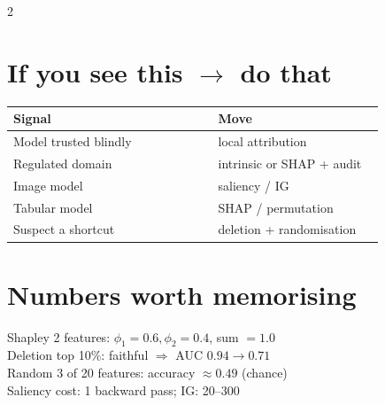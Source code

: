 \documentclass[11pt,a4paper]{article}
\newcommand{\sect}[1]{\section*{#1}}
\begin{document}
\begin{multicols}{2}
\sect{If you see this $\rightarrow$ do that}
\begin{tabular}{@{}p{0.52\linewidth}p{0.42\linewidth}@{}}
\toprule
Signal & Move\\
\midrule
Model trusted blindly & local attribution\\
Regulated domain & intrinsic or SHAP + audit\\
Image model & saliency / IG\\
Tabular model & SHAP / permutation\\
Suspect a shortcut & deletion + randomisation\\
\bottomrule
\end{tabular}


\sect{Numbers worth memorising}
Shapley 2 features: $\phi_1=0.6,\phi_2=0.4$, sum $=1.0$\\
Deletion top 10\%: faithful $\Rightarrow$ AUC $0.94\to0.71$\\
Random 3 of 20 features: accuracy $\approx0.49$ (chance)\\
Saliency cost: 1 backward pass; IG: 20--300

\end{multicols}
\end{document}
